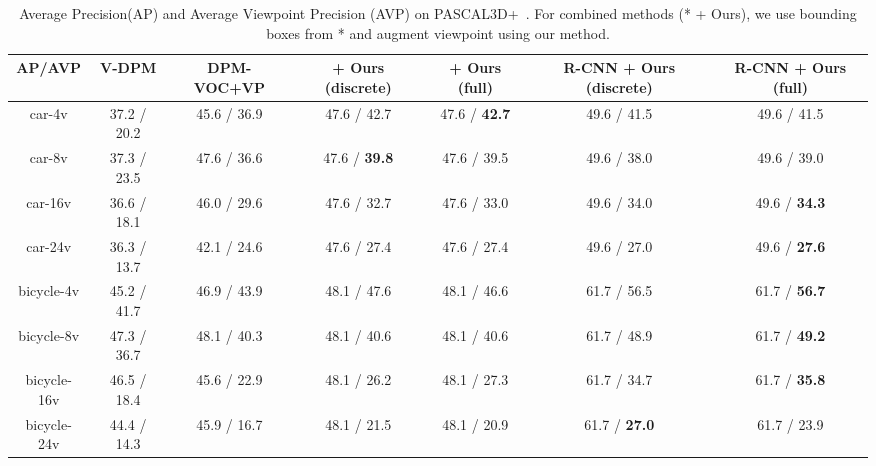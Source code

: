 %
\begin{table*}[t]
    \footnotesize
  \begin{center}
\begin{tabular}{|c||c||c||c|c||c|c|}
\hline
AP/AVP              & V-DPM \cite{Xiang14} & DPM-VOC+VP \cite{Pepik12}  & \cite{Pepik12} + Ours (discrete) & \cite{Pepik12} + Ours (full) & R-CNN + Ours (discrete) & R-CNN + Ours (full)\\
\hline\hline
car-4v              & 37.2 / 20.2         & 45.6 / 36.9             & 47.6 / 42.7       & 47.6 / \textbf{42.7}        & 49.6 / 41.5         & 49.6 / 41.5\\ \hline
car-8v              & 37.3 / 23.5         & 47.6 / 36.6             & 47.6 / \textbf{39.8}       & 47.6 / 39.5        & 49.6 / 38.0         & 49.6 / 39.0\\ \hline
car-16v             & 36.6 / 18.1         & 46.0 / 29.6             & 47.6 / 32.7       & 47.6 / 33.0        & 49.6 / 34.0         & 49.6 / \textbf{34.3}\\ \hline
car-24v             & 36.3 / 13.7         & 42.1 / 24.6             & 47.6 / 27.4       & 47.6 / 27.4        & 49.6 / 27.0         & 49.6 / \textbf{27.6}\\ \hline
\hline
bicycle-4v          & 45.2 / 41.7         & 46.9 / 43.9             & 48.1 / 47.6       & 48.1 / 46.6        & 61.7 / 56.5         & 61.7 / \textbf{56.7}\\ \hline
bicycle-8v          & 47.3 / 36.7         & 48.1 / 40.3             & 48.1 / 40.6       & 48.1 / 40.6        & 61.7 / 48.9         & 61.7 / \textbf{49.2}\\ \hline
bicycle-16v         & 46.5 / 18.4         & 45.6 / 22.9             & 48.1 / 26.2       & 48.1 / 27.3        & 61.7 / 34.7         & 61.7 / \textbf{35.8}\\ \hline
bicycle-24v         & 44.4 / 14.3         & 45.9 / 16.7             & 48.1 / 21.5       & 48.1 / 20.9        & 61.7 / \textbf{27.0}         & 61.7 / 23.9\\ \hline
\end{tabular}
\end{center}
\caption{Average Precision(AP) and Average Viewpoint Precision (AVP) on
  PASCAL3D+~\cite{Xiang14}. For combined methods (* + Ours), we use
  bounding boxes from * and augment viewpoint using our method.}
\label{tab:pascal12}
\end{table*}

